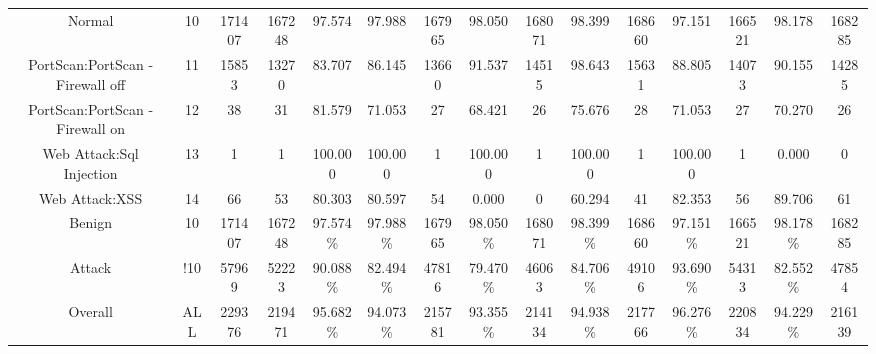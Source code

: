 \begin{table}[htb]
\begin{tabular}{@{}ccccccccccccccc@{}}
        Normal &  10 &  171407 &  167248 &  97.574 &  97.988 &  167965 &  98.050 &  168071 &  98.399 &  168660 &  97.151 &  166521 &  98.178 &  168285 \\
        PortScan:PortScan - Firewall off &  11 &  15853 &  13270 &  83.707 &  86.145 &  13660 &  91.537 &  14515 &  98.643 &  15631 &  88.805 &  14073 &  90.155 &  14285 \\
        PortScan:PortScan - Firewall on &  12 &  38 &  31 &  81.579 &  71.053 &  27 &  68.421 &  26 &  75.676 &  28 &  71.053 &  27 &  70.270 &  26 \\
        Web Attack:Sql Injection &  13 &  1 &  1 &  100.000 &  100.000 &  1 &  100.000 &  1 &  100.000 &  1 &  100.000 &  1 &  0.000 &  0 \\
        Web Attack:XSS &  14 &  66 &  53 &  80.303 &  80.597 &  54 &  0.000 &  0 &  60.294 &  41 &  82.353 &  56 &  89.706 &  61 \\
        Benign &  10 &  171407 &  167248 &  97.574\% &  97.988\% &  167965 &  98.050\% &  168071 &  98.399\% &  168660 &  97.151\% &  166521 &  98.178\% &  168285 \\
        Attack &  !10 &  57969 &  52223 &  90.088\% &  82.494\% &  47816 &  79.470\% &  46063 &  84.706\% &  49106 &  93.690\% &  54313 &  82.552\% &  47854 \\
        Overall &  ALL &  229376 &  219471 &  95.682\% &  94.073\% &  215781 &  93.355\% &  214134 &  94.938\% &  217766 &  96.276\% &  220834 &  94.229\% &  216139 \\
        \bottomrule
    \end{tabular}
\end{table}